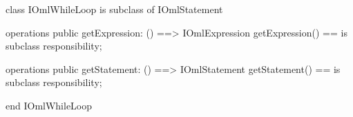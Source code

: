 \begin{vdm_al}
class IOmlWhileLoop
 is subclass of IOmlStatement

operations
  public getExpression: () ==> IOmlExpression
  getExpression() == is subclass responsibility;

operations
  public getStatement: () ==> IOmlStatement
  getStatement() == is subclass responsibility;

end IOmlWhileLoop
\end{vdm_al}

